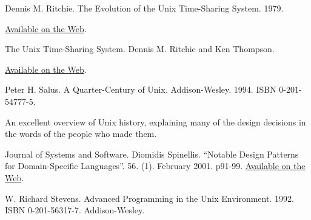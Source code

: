 \documentclass[12pt,oneside]{book}
\begin{document}
\begin{common-format}
\begin{thebibliography}{9}
\bibitem[Ritchie79] Dennis M. Ritchie. The Evolution of the Unix Time-Sharing System. 1979.

\href{http://cm.bell-labs.com/cm/cs/who/dmr/hist.html}{Available on the Web}.

%
%
%
%
 The Unix Time-Sharing System. Dennis M. Ritchie and Ken Thompson.

\href{http://cm.bell-labs.com/cm/cs/who/dmr/cacm.html}{Available on the Web}.



 Peter H. Salus. A Quarter-Century of Unix. Addison-Wesley. 1994. ISBN 0-201-54777-5.

An excellent overview of Unix history, explaining many of the design decisions in the words of the people who made them.

%
%
%
 Journal of Systems and Software. Diomidis Spinellis. “Notable Design Patterns for Domain-Specific Languages”. 56. (1). February 2001. p91-99. \href{http://www.catb.org/~esr/writings/taoup/html/apb.html}{Available on the Web}.

%
%
%
%
%

 W. Richard Stevens. Advanced Programming in the Unix Environment. 1992. ISBN 0-201-56317-7. Addison-Wesley.


\end{thebibliography}
\end{common-format}
\end{document}
